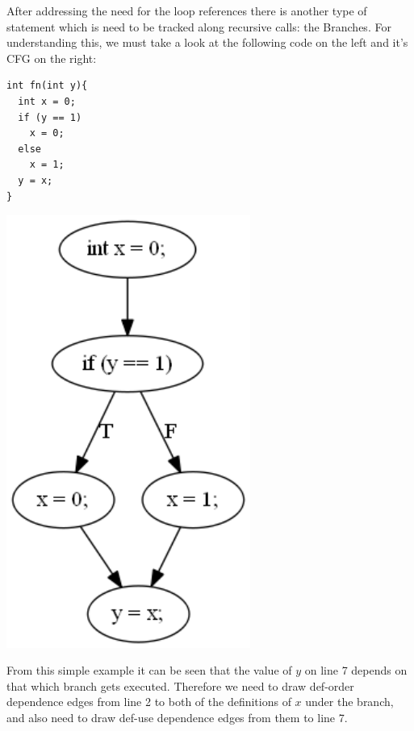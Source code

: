 \documentclass[oneside,12pt,a4paper]{book}
\begin{document}
After addressing the need for the loop references there is another type of statement which is need to be tracked along recursive calls: the Branches. For understanding this, we must take a look at the following code on the left and it's CFG on the right:

\begin{minipage}[c]{0.5\textwidth}
\begin{lstlisting}
int fn(int y){
  int x = 0;
  if (y == 1)
    x = 0;
  else
    x = 1;
  y = x;
}
\end{lstlisting}
\end{minipage}%
\begin{minipage}[c]{0.5\textwidth}
\centering
\includegraphics[width=0.6\textwidth]{if_test_cfg.png}
\end{minipage}

From this simple example it can be seen that the value of $y$ on line 7 depends on that which branch gets executed. Therefore we need to draw def-order dependence edges from line 2 to both of the definitions of $x$ under the branch, and also need to draw def-use dependence edges from them to line 7.
\end{document}
